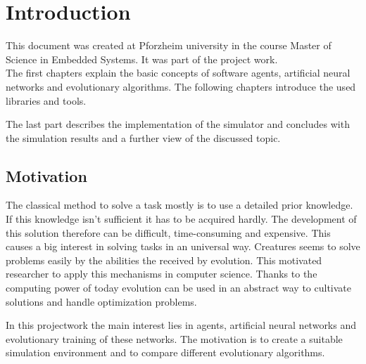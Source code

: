 \documentclass[10pt,a4paper,DIV=11]{scrreprt}
\begin{document}
\chapter{Introduction}
This document was created at Pforzheim university in the course Master of Science in Embedded Systems.
It was part of the project work. \\

The first chapters explain the basic concepts of software agents, artificial neural networks and evolutionary algorithms.
The following chapters introduce the used libraries and tools.

The last part describes the implementation of the simulator and concludes with the simulation results and a further view of the discussed topic.

\section{Motivation}
The classical method to solve a task mostly is to use a detailed prior knowledge. If this knowledge isn't sufficient it has to be acquired hardly. The development of this solution therefore can be difficult, time-consuming and expensive.
This causes a big interest in solving tasks in an universal way. Creatures seems to solve problems easily by the abilities the received by evolution. This motivated researcher to apply this mechanisms in computer science. Thanks to the computing power of today evolution can be used in an abstract way to cultivate solutions and handle optimization problems.


In this projectwork the main interest lies in agents, artificial neural networks and evolutionary training of these networks.
The motivation is to create a suitable simulation environment and to compare different evolutionary algorithms.






\end{document}
